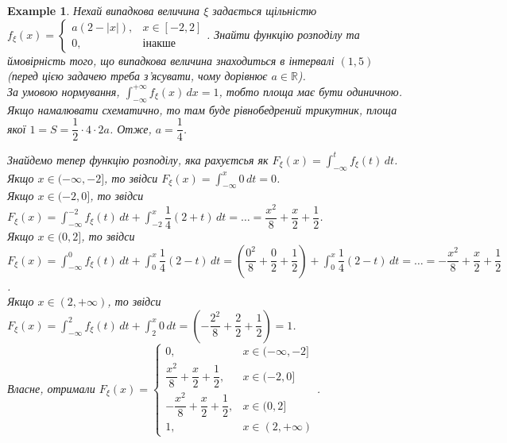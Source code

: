 \documentclass[a4paper, 10pt]{article}
\theoremstyle{theoremdd}
\newtheorem{example}[theorem]{Example}
\begin{document}
\begin{example}
Нехай випадкова величина $\xi$ задається щільністю $f_\xi(x) = \begin{cases} a(2 - |x|), & x \in [-2,2] \\ 0, & \text{інакше} \end{cases}$. Знайти функцію розподілу та ймовірність того, що випадкова величина знаходиться в інтервалі $(1,5)$ (перед цією задачею треба з'ясувати, чому дорівнює $a \in \mathbb{R}$).\\
За умовою нормування, $\displaystyle\int_{-\infty}^{+\infty} f_\xi(x)\,dx = 1$, тобто площа має бути одиничною. Якщо намалювати схематично, то там буде рівнобедрений трикутник, площа якої $1 = S = \dfrac{1}{2} \cdot 4 \cdot 2a$. Отже, $a = \dfrac{1}{4}$.
\begin{figure}[H]
\centering
{}
\end{figure}
\noindent
Знайдемо тепер функцію розподілу, яка рахуєтсья як $F_\xi(x) = \displaystyle\int_{-\infty}^t f_\xi(t)\,dt$.\\
Якщо $x \in (-\infty,-2]$, то звідси $F_\xi(x) = \displaystyle\int_{-\infty}^x 0\,dt = 0$.\\
Якщо $x \in (-2,0]$, то звідси $F_\xi(x) = \displaystyle\int_{-\infty}^{-2} f_\xi(t)\,dt + \int_{-2}^x \dfrac{1}{4}(2+t)\,dt = \dots = \dfrac{x^2}{8} + \dfrac{x}{2} + \dfrac{1}{2}$.\\
Якщо $x \in (0,2]$, то звідси $F_\xi(x) = \displaystyle\int_{-\infty}^0 f_\xi(t)\,dt + \int_0^x \dfrac{1}{4}(2-t)\,dt = \left( \dfrac{0^2}{8} + \dfrac{0}{2} + \dfrac{1}{2} \right) + \int_0^x \dfrac{1}{4}(2-t)\,dt = \dots = -\dfrac{x^2}{8} + \dfrac{x}{2} + \dfrac{1}{2}$.\\
Якщо $x \in (2,+\infty)$, то звідси $F_\xi(x) = \displaystyle\int_{-\infty}^2 f_\xi(t)\,dt + \int_2^x 0\,dt = \left( -\dfrac{2^2}{8} + \dfrac{2}{2} + \dfrac{1}{2} \right) = 1$.\\
Власне, отримали $F_\xi(x) = \begin{cases} 0, & x \in (-\infty,-2] \\ \dfrac{x^2}{8} + \dfrac{x}{2} + \dfrac{1}{2}, & x \in (-2,0] \\ -\dfrac{x^2}{8} + \dfrac{x}{2} + \dfrac{1}{2}, & x \in (0,2] \\ 1, & x \in (2,+\infty) \end{cases}$.\\

\end{example}
\end{document}
